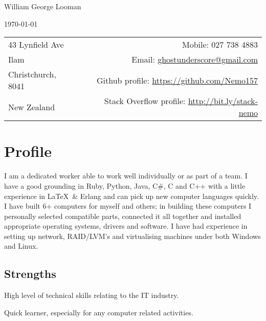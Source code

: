 \documentclass[10pt]{article}
\newenvironment{packed_items}{
    \begin{itemize}
    \setlength{\itemsep}{1pt}
    \setlength{\parskip}{0pt}
    \setlength{\parsep}{0pt}
}{\end{itemize}}
\begin{document}
    \begin{centering}
        {\LARGE William George Looman}
        
        {\today}
        
        \vspace{10pt}

        {
            \begin{tabularx}{\textwidth}{lXr}
            43 Lynfield Ave     &  &                   Mobile: 027 738 4883 \\
            Ilam                &  & Email: \url{ghostunderscore@gmail.com} \\
            Christchurch, 8041  &  & Github profile: \url{https://github.com/Nemo157} \\
            New Zealand         &  & Stack Overflow profile: \url{http://bit.ly/stack-nemo}
            \end{tabularx}
        }
    \end{centering}

    \section*{Profile}\small
    \vspace{-5pt}

        I am a dedicated worker able to work well individually or as part of a
        team. I have a good grounding in Ruby, Python, Java, C\#, C and C++ with a little
        experience in \LaTeX\, \& Erlang and can pick up new computer languages
        quickly. I have built 6+ computers for myself and others; in building
        these computers I personally selected compatible parts, connected it all
        together and installed appropriate operating systems, drivers and
        software. I have had experience in setting up network, RAID/LVM’s and
        virtualising machines under both Windows and Linux.

        \subsection*{Strengths}
        \begin{packed_items}\small
            \item{High level of technical skills relating to the IT industry.}
            \item{Quick learner, especially for any computer related activities.}
        \end{packed_items}
\end{document}
